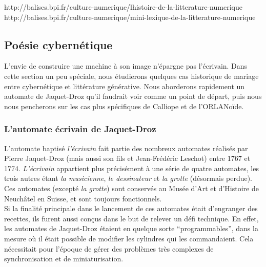 \documentclass{article}
\begin{document}
			http://balises.bpi.fr/culture-numerique/lhistoire-de-la-litterature-numerique
			http://balises.bpi.fr/culture-numerique/mini-lexique-de-la-litterature-numerique
				
				
			
		\subsection{Poésie cybernétique}
			L'envie de construire une machine à son image n'épargne pas l'écrivain. Dans cette section un peu spéciale, nous étudierons quelques cas historique de mariage entre cybernétique et littérature générative. Nous aborderons rapidement un automate de Jaquet-Droz qu'il faudrait voir comme un point de départ, puis nous nous pencherons sur les cas plus spécifiques de Calliope et de l'ORLANoïde.
			
			\subsubsection{L'automate écrivain de Jaquet-Droz}
				L'automate baptisé \textit{l'écrivain} fait partie des nombreux automates réalisés par Pierre Jaquet-Droz (mais aussi son fils et Jean-Frédéric Leschot) entre 1767 et 1774. \textit{L'écrivain} appartient plus précisément à une série de quatre automates, les trois autres étant \textit{la musicienne}, \textit{le dessinateur} et \textit{la grotte} (désormais perdue). Ces automates (excepté \textit{la grotte}) sont conservés au Musée d'Art et d'Histoire de Neuchâtel en Suisse, et sont toujours fonctionnels.\\
				
				Si la finalité principale dans le lancement de ces automates était d'engranger des recettes, ils furent aussi conçus dans le but de relever un défi technique. En effet, les automates de Jaquet-Droz étaient en quelque sorte ``programmables'', dans la mesure où il était possible de modifier les cylindres qui les commandaient. Cela nécessitait pour l'époque de gérer des problèmes très complexes de synchronisation et de miniaturisation.\\
				
\end{document}
